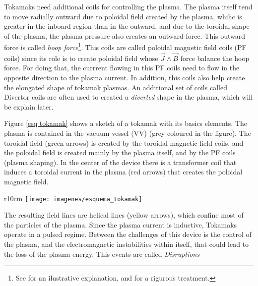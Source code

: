 \documentclass[a4paper,12pt,oneside]{book}
\begin{document}
Tokamaks need additional coils for controlling the plasma. The plasma itself tend to move radially outward due to poloidal field created by the plasma, whihc is greater in the inboard region than in the outward, and due to the toroidal shape of the plasma, the plasma pressure also creates an outward force. This outward force is called \textit{hoop force}\footnote{See \cite{Linjin} for an ilustrative explanation, and \cite{Miyamoto} for a rigurous treatment.}. This coils are called poloidal magnetic field coils (PF coils) since its role is to create poloidal field whose $\vec{J} \wedge \vec{B}$ force balance the hoop force. For doing that, the currrent flowing in this PF coils need to flow in the opposite direction to the plasma current. In addition, this coils also help create the elongated shape of tokamak plasmas. An additional set of coils called Divertor coils are often used to created a \textit{diverted} shape in the plasma, which will be explain later. 

Figure \ref{esq tokamak} shows a sketch of a tokamak with its basics elements. The plasma is contained in the vacuum vessel (VV) (grey coloured in the figure). The toroidal field (green arrows) is created by the toroidal magnetic field coils, and the poloidal field is created mainly by the plasma itself, and by the PF coils (plasma shaping). In the center of the device there is a transformer coil that induces a toroidal current in the plasma (red arrows) that creates the poloidal magnetic field. 
\begin{wrapfigure}{r}{10cm}
\centering
\texttt{[image: imagenes/esquema\_tokamak]}
\caption{Sketch of a tokamak, showing its basic elements, the field lines and the plasma current. Source: google images, 2019.}
\label{esq tokamak}
\end{wrapfigure} 
%
The resulting field lines are helical lines (yellow arrows), which confine most of the particles of the plasma. Since the plasma current is inductive, Tokamaks operate in a pulsed regime.  Between the challenges of this device is the control of the plasma, and the electromagnetic instabilities within itself, that could lead to the loss of the plasma energy. This events are called \textit{Disruptions}
\end{document}

